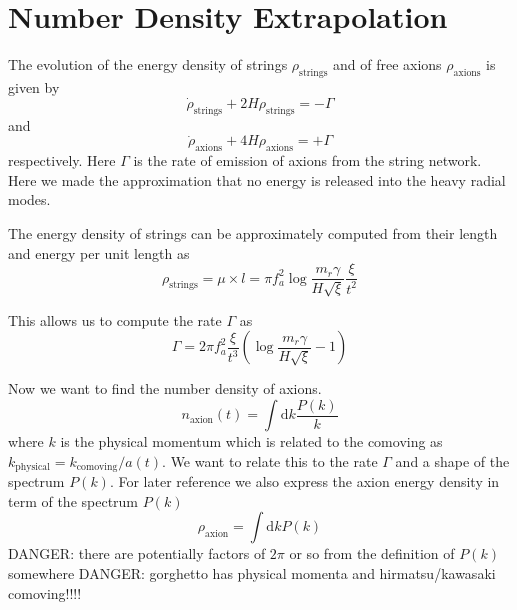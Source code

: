 \documentclass[a4paper]{article}
\begin{document}
\newpage
\section{Number Density Extrapolation}

The evolution of the energy density of strings $\rho_\mathrm{strings}$
and of free axions $\rho_\mathrm{axions}$ is given by
\begin{equation}
	\label{eq:string_energy_eom}
	\dot{\rho}_\mathrm{strings} + 2 H \rho_\mathrm{strings} = - \Gamma
\end{equation}
and
\begin{equation}
	\label{eq:axion_energy_eom}
	\dot{\rho}_\mathrm{axions} + 4 H \rho_\mathrm{axions} = + \Gamma
\end{equation}
respectively.
Here $\Gamma$ is the rate of emission of axions from the string network.
Here we made the approximation that no energy is released into the heavy radial modes. 

The energy density of strings can be approximately computed from their length and energy per unit length as
\begin{equation}
	\rho_\mathrm{strings} = \mu \times l = \pi f_a^2 \log \frac{m_r \gamma}{H \sqrt{\xi}} \frac{\xi}{t^2}
\end{equation}

This allows us to compute the rate $\Gamma$ as 
\begin{equation}
	\Gamma = 2 \pi f_a^2 \frac{\xi}{t^3} \left( \log \frac{m_r \gamma}{H \sqrt{\xi}} - 1  \right)
\end{equation}

Now we want to find the number density of axions.
\begin{equation}
	\label{eq:number_density_from_spectrum}
	n_\mathrm{axion}(t) = \int \mathrm{d} k \frac{P(k)}{k} 
\end{equation}
where $k$ is the physical momentum which is related to the comoving as $k_\mathrm{physical} = k_\mathrm{comoving} / a(t)$.
We want to relate this to the rate $\Gamma$ and a shape of the spectrum $P(k)$.
For later reference we also express the axion energy density in term of the spectrum $P(k)$
\begin{equation}
	\rho_\mathrm{axion}  = \int \mathrm{d} k P(k)
\end{equation}
DANGER: there are potentially factors of $2\pi$ or so from the definition of $P(k)$ somewhere 
DANGER: gorghetto has physical momenta and hirmatsu/kawasaki comoving!!!!
\end{document}
